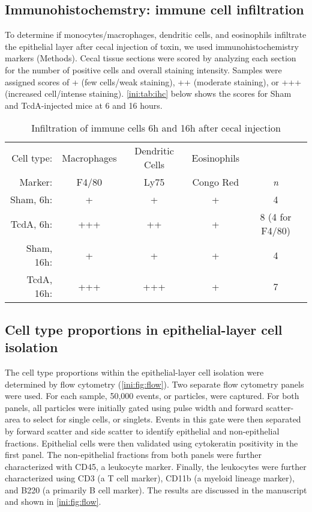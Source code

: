 \subsection{Immunohistochemstry: immune cell infiltration}

To determine if monocytes/macrophages, dendritic cells, and eosinophils
infiltrate the epithelial layer after cecal injection of toxin, we used
immunohistochemistry markers (Methods). Cecal tissue sections were scored 
by analyzing each section for the number of positive cells and overall
staining intensity.  Samples were assigned scores of + (few cells/weak staining), 
++ (moderate staining), or +++ (increased cell/intense staining). \autoref{ini:tab:ihc}
below shows the scores for Sham and TcdA-injected mice at 6 and 16 hours.

\begin{table}[ht]
\centering
\begin{tabular}{ r c c c c }
  Cell type: & Macrophages & Dendritic Cells & Eosinophils &  \\
  Marker: & F4/80 & Ly75 & Congo Red & \emph{n}\\ \hline
  Sham, 6h: & + & + & + & 4 \\
  TcdA, 6h: & +++ & ++ & + & 8 (4 for F4/80) \\
  Sham, 16h: & + & + & + & 4 \\
  TcdA, 16h: & +++ & +++ & + & 7 \\
\end{tabular}
\caption{Infiltration of immune cells 6h and 16h after cecal injection}
\label{ini:tab:ihc}
\end{table}

\subsection{Cell type proportions in epithelial-layer cell isolation}

The cell type proportions within the epithelial-layer cell isolation
were determined by flow cytometry (\autoref{ini:fig:flow}). Two
separate flow cytometry panels were used. For each sample, 50,000
events, or particles, were captured. 
For both panels, all particles were initially gated using pulse 
width and forward scatter-area to select for single 
cells, or singlets.  Events in this gate were then separated 
by forward scatter and side scatter to identify epithelial 
and non-epithelial fractions.  Epithelial cells were then 
validated using cytokeratin positivity in the first panel.  
The non-epithelial fractions from both panels were further characterized
with CD45, a leukocyte marker. Finally, the leukocytes were further characterized
using CD3 (a T cell marker), CD11b (a myeloid lineage marker), and 
B220 (a primarily B cell marker). The results are discussed in the manuscript
and shown in \autoref{ini:fig:flow}.


